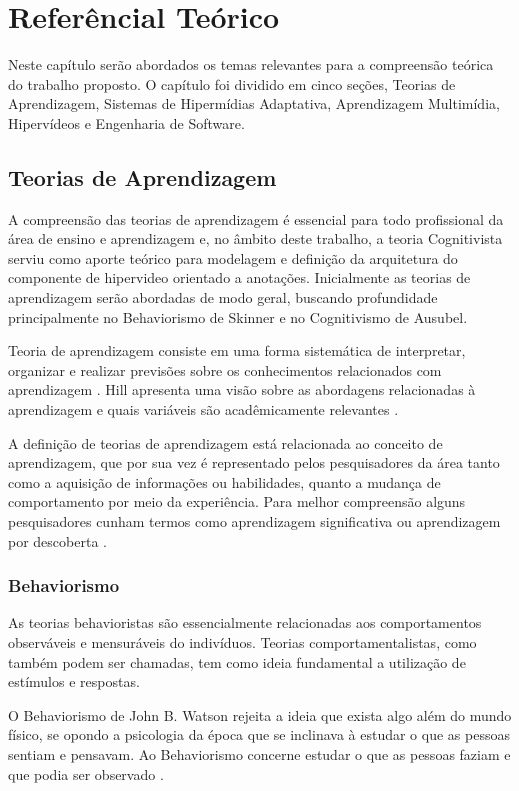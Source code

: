 \chapter[Referêncial Teórico]{Referêncial Teórico}

Neste capítulo serão abordados os temas relevantes para a compreensão teórica do trabalho proposto. O capítulo foi dividido em cinco seções, Teorias de Aprendizagem, Sistemas de Hipermídias Adaptativa, Aprendizagem Multimídia, Hipervídeos e Engenharia de Software.

\section{Teorias de Aprendizagem}

A compreensão das teorias de aprendizagem é essencial para todo profissional da área de ensino e aprendizagem e, no âmbito deste trabalho, a teoria Cognitivista serviu como aporte teórico para modelagem e definição da arquitetura do componente de hipervideo orientado a anotações. Inicialmente as teorias de aprendizagem serão abordadas de modo geral, buscando profundidade principalmente no Behaviorismo de Skinner e no Cognitivismo de Ausubel.

Teoria de aprendizagem consiste em uma forma sistemática de interpretar, organizar e realizar previsões sobre os conhecimentos relacionados com aprendizagem \cite{moreira1999}. Hill apresenta uma visão sobre as abordagens relacionadas à aprendizagem e quais variáveis são acadêmicamente relevantes \cite{hill2002}.

A definição de teorias de aprendizagem está relacionada ao conceito de aprendizagem, que por sua vez é representado pelos pesquisadores da área tanto como a aquisição de informações ou habilidades, quanto a mudança de comportamento por meio da experiência. Para melhor compreensão alguns pesquisadores cunham termos como aprendizagem significativa ou aprendizagem por descoberta \cite{fragelli2010}.

\subsection{Behaviorismo}

As teorias behavioristas são essencialmente relacionadas aos comportamentos observáveis e mensuráveis do indivíduos. Teorias comportamentalistas, como também podem ser chamadas, tem como ideia fundamental a utilização de estímulos e respostas.

O Behaviorismo de John B. Watson rejeita a ideia que exista algo além do mundo físico, se opondo a psicologia da época que se inclinava à estudar o que as pessoas sentiam e pensavam. Ao Behaviorismo concerne estudar o que as pessoas faziam e que podia ser observado \cite{moreira1999}.


